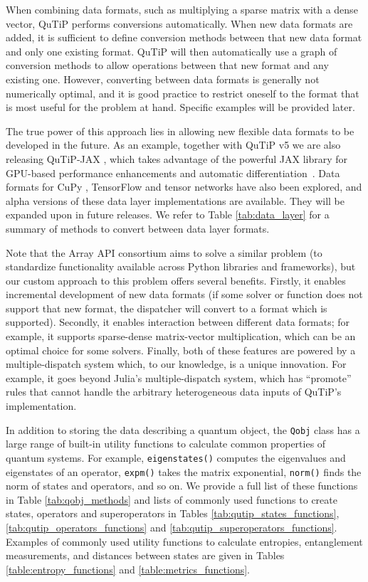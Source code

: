 \documentclass[preprint,3p,sort&compress]{elsarticle}
\def\code#1{\texttt{#1}}
\begin{document}
When combining data formats, such as multiplying a sparse matrix with a dense vector, QuTiP performs conversions automatically. When new data formats are added, it is sufficient to define conversion methods between that new data format and only one existing format. QuTiP will then automatically use a graph of conversion methods to allow operations between that new format and any existing one. However, converting between data formats is generally not numerically optimal, and it is good practice to restrict oneself to the format that is most useful for the problem at hand.  Specific examples will be provided later. 

The true power of this approach lies in allowing new flexible data formats to be developed in the future. As an example, together with QuTiP v5 we are also releasing QuTiP-JAX \cite{qjax}, which takes advantage of the powerful JAX library for GPU-based performance enhancements and automatic differentiation~\cite{jax2018github}. Data formats for CuPy \cite{cupy}, TensorFlow \cite{tflow} and tensor networks \cite{tnetwork} have also been explored, and alpha versions of these data layer implementations are available. They will be expanded upon in future releases.  We refer to Table \ref{tab:data_layer} for a summary of methods to convert between data layer formats.

Note that the Array API consortium \cite{arrayconsort} aims to solve a similar problem (to standardize functionality available across Python libraries and frameworks), but our custom approach to this problem offers several benefits. Firstly, it enables incremental development of new data formats (if some solver or function does not support that new format, the dispatcher will convert to a format which is supported).  Secondly, it enables interaction between different data formats; for example, it supports sparse-dense matrix-vector multiplication, which can be an optimal choice for some solvers. Finally, both of these features are powered by a multiple-dispatch system which, to our knowledge, is a unique innovation. For example, it goes beyond Julia's multiple-dispatch system, which has ``promote'' rules that cannot handle the arbitrary heterogeneous data inputs of QuTiP's implementation.

In addition to storing the data describing a quantum object, the \code{Qobj} class has a large range of built-in utility functions to calculate common properties of quantum systems. For example, \code{eigenstates()} computes the eigenvalues and eigenstates of an operator, \code{expm()} takes the matrix exponential, \code{norm()} finds the norm of states and operators, and so on.  We provide a full list of these functions in Table \ref{tab:qobj_methods} and lists of commonly used functions to create states, operators and superoperators in Tables \ref{tab:qutip_states_functions}, \ref{tab:qutip_operators_functions} and \ref{tab:qutip_superoperators_functions}. Examples of commonly used utility functions to calculate entropies, entanglement measurements, and distances between states are given in Tables \ref{table:entropy_functions} and \ref{table:metrics_functions}.
\end{document}
